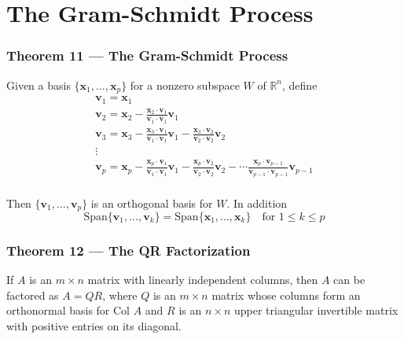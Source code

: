 \documentclass{article}
\begin{document}
\section*{The Gram-Schmidt Process}

\subsubsection*{Theorem 11 --- The Gram-Schmidt Process}
Given a basis $\{\mathbf{x}_1, \ldots, \mathbf{x}_p\}$ for a nonzero subspace $W$ of
$\mathbb{R}^n$, define
\[\begin{array}{l}
    \mathbf{v}_1 = \mathbf{x}_1 \\
    \mathbf{v}_2 = \mathbf{x}_2 - \frac{\mathbf{x}_2\cdot \mathbf{v}_1}{\mathbf{v}_1\cdot
    \mathbf{v}_1} \mathbf{v}_1 \\
    \mathbf{v}_3 = \mathbf{x}_3 - \frac{\mathbf{x}_3\cdot \mathbf{v}_1}{\mathbf{v}_1\cdot
    \mathbf{v}_1} \mathbf{v}_1 - \frac{\mathbf{x}_3\cdot \mathbf{v}_2}{\mathbf{v}_2\cdot
    \mathbf{v}_2} \mathbf{v}_2 \\
    \vdots \\
    \mathbf{v}_p = \mathbf{x}_p - \frac{\mathbf{x}_p\cdot \mathbf{v}_1}{\mathbf{v}_1\cdot
    \mathbf{v}_1} \mathbf{v}_1 - \frac{\mathbf{x}_p\cdot \mathbf{v}_2}{\mathbf{v}_2\cdot
    \mathbf{v}_2} \mathbf{v}_2 - \cdots \frac{\mathbf{x}_p\cdot \mathbf{v}_{p-1}}
    {\mathbf{v}_{p-1}\cdot \mathbf{v}_{p-1}} \mathbf{v}_{p-1} \\
\end{array}\]

Then $\{\mathbf{v}_1, \ldots, \mathbf{v}_p\}$ is an orthogonal basis for $W$. In addition
\[\text{Span}\{\mathbf{v}_1, \ldots, \mathbf{v}_k\} = \text{Span}\{\mathbf{x}_1, \ldots,
\mathbf{x}_k\}\quad \text{for } 1 \leq k \leq p\]

\subsubsection*{Theorem 12 --- The QR Factorization}
If $A$ is an $m\times n$ matrix with linearly independent columns, then $A$ can be factored as
$A=QR$, where $Q$ is an $m\times n$ matrix whose columns form an orthonormal basis for
$\text{Col } A$ and $R$ is an $n\times n$ upper triangular invertible matrix with positive entries
on its diagonal.
\end{document}
